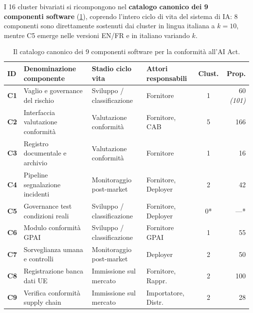\documentclass[12pt,a4paper,oneside]{report}
\begin{document}
I 16 cluster bivariati si ricompongono nel \textbf{catalogo canonico dei 9 componenti software} (\cref{tab:catalogo_componenti}), coprendo l'intero ciclo di vita del sistema di IA: 8 componenti sono direttamente sostenuti dai cluster in lingua italiana a $k = 10$, mentre C5 emerge nelle versioni EN/FR e in italiano variando $k$.
\begin{table}[htbp]
  \centering
  \small
  \caption[Il catalogo canonico dei 9 componenti software]{Il catalogo canonico dei 9 componenti software per la conformità all'AI Act.}
  \label{tab:catalogo_componenti}
  \begin{tabularx}{\textwidth}{l X p{3.2cm} p{2.6cm} c r}
    \toprule
    \textbf{ID} & \textbf{Denominazione componente} & \textbf{Stadio ciclo vita} & \textbf{Attori responsabili} & \textbf{Clust.} & \textbf{Prop.} \\
    \midrule
    \textbf{C1} & Vaglio e governance del rischio & Sviluppo / classificazione & Fornitore & 1 & 60 \emph{(101)} \\
    \textbf{C2} & Interfaccia valutazione conformità & Valutazione conformità & Fornitore, CAB & 5 & 166 \\
    \textbf{C3} & Registro documentale e archivio & Valutazione conformità & Fornitore & 1 & 16 \\
    \textbf{C4} & Pipeline segnalazione incidenti & Monitoraggio post-market & Fornitore, Deployer & 2 & 42 \\
    \textbf{C5} & Governance test condizioni reali & Sviluppo / classificazione & Fornitore, Deployer & 0* & ---* \\
    \textbf{C6} & Modulo conformità GPAI & Sviluppo / classificazione & Fornitore GPAI & 1 & 55 \\
    \textbf{C7} & Sorveglianza umana e controlli & Monitoraggio post-market & Deployer & 2 & 50 \\
    \textbf{C8} & Registrazione banca dati UE & Immissione sul mercato & Fornitore, Rappr. & 2 & 100 \\
    \textbf{C9} & Verifica conformità supply chain & Immissione sul mercato & Importatore, Distr. & 2 & 28 \\
    \bottomrule
  \end{tabularx}
\end{table}
\end{document}
